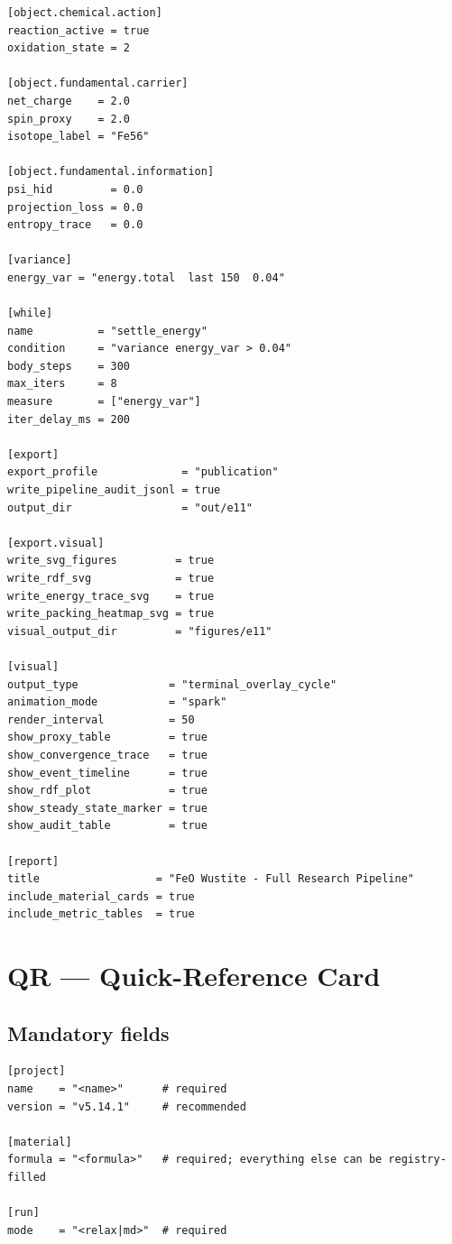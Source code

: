 \documentclass[11pt,a4paper]{article}
\begin{document}
\begin{tcolorbox}[scriptbox, scriptheader, title={e11\_full\_pipeline.vsim}]
\begin{lstlisting}[style=vsimlst]
[object.chemical.action]
reaction_active = true
oxidation_state = 2

[object.fundamental.carrier]
net_charge    = 2.0
spin_proxy    = 2.0
isotope_label = "Fe56"

[object.fundamental.information]
psi_hid         = 0.0
projection_loss = 0.0
entropy_trace   = 0.0

[variance]
energy_var = "energy.total  last 150  0.04"

[while]
name          = "settle_energy"
condition     = "variance energy_var > 0.04"
body_steps    = 300
max_iters     = 8
measure       = ["energy_var"]
iter_delay_ms = 200

[export]
export_profile             = "publication"
write_pipeline_audit_jsonl = true
output_dir                 = "out/e11"

[export.visual]
write_svg_figures         = true
write_rdf_svg             = true
write_energy_trace_svg    = true
write_packing_heatmap_svg = true
visual_output_dir         = "figures/e11"

[visual]
output_type              = "terminal_overlay_cycle"
animation_mode           = "spark"
render_interval          = 50
show_proxy_table         = true
show_convergence_trace   = true
show_event_timeline      = true
show_rdf_plot            = true
show_steady_state_marker = true
show_audit_table         = true

[report]
title                  = "FeO Wustite - Full Research Pipeline"
include_material_cards = true
include_metric_tables  = true
\end{lstlisting}
\end{tcolorbox}

\newpage
\section*{QR — Quick-Reference Card}

\subsection*{Mandatory fields}
\begin{tcolorbox}[scriptbox]
\begin{lstlisting}[style=vsimlst]
[project]
name    = "<name>"      # required
version = "v5.14.1"     # recommended

[material]
formula = "<formula>"   # required; everything else can be registry-filled

[run]
mode    = "<relax|md>"  # required
\end{lstlisting}
\end{tcolorbox}
\end{document}
